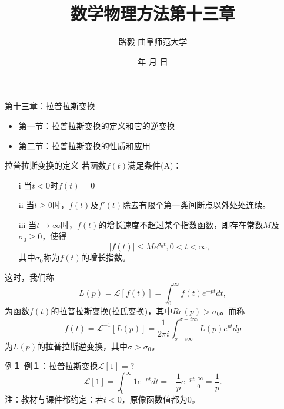 \documentclass[11pt]{beamer}
\begin{document}
	\author{ 路毅 \hspace{0.3cm} 曲阜师范大学 }
	\date{\number\year 年 \number\month 月 \number\day 日}
	\title{数学物理方法第十三章}

\begin{frame}
	\maketitle
\end{frame}

\kaishu

\begin{frame}{第十三章：拉普拉斯变换}
\begin{itemize}
	\item 第一节：拉普拉斯变换的定义和它的逆变换
	\vspace{1cm}
	\item 第二节：拉普拉斯变换的性质和应用
\end{itemize}
\end{frame}

\begin{frame}{拉普拉斯变换的定义}
若函数$f(t)$满足条件(A)：
\begin{itemize}
\item [i] 当$t<0$时$f(t)=0$
\item [ii] 当$t\geq 0$时，$f(t)$及$f'(t)$除去有限个第一类间断点以外处处连续。
\item [iii] 当$t \rightarrow \infty$时，$f(t)$的增长速度不超过某个指数函数，即存在常数$M$及$\sigma_0 \geq 0$，使得
\begin{equation}
|f(t)| \leq M e^{\sigma_0 t}, 0<t<\infty,
\end{equation}
其中$\sigma_0$称为$f(t)$的增长指数。
\end{itemize}
这时，我们称
\begin{equation}
L(p) = \mathscr{L}[f(t)] = \int^\infty_0 f(t) e^{-pt} dt,
\end{equation}
为函数$f(t)$的拉普拉斯变换(拉氏变换)，其中$Re(p) > \sigma_0$。而称
\begin{equation}
f(t) = \mathscr{L}^{-1} [ L(p) ] = \frac{1}{2\pi i} \int^{\sigma + i \infty}_{\sigma - i \infty} L(p) e^{pt} dp
\end{equation}
为$L(p)$的拉普拉斯逆变换，其中$\sigma > \sigma_0$。
\end{frame}

\begin{frame}{例１}
例１：拉普拉斯变换$\mathscr{L}[ 1 ] = ?$
\begin{equation}
\mathscr{L}[1] = \int^\infty_0 1 e^{-pt} dt = - \frac{1}{p} e^{-pt} |^\infty_0 = \frac{1}{p}.
\end{equation}
注：教材与课件都约定：若$t <0$，原像函数值都为0。
\end{frame}
\end{document}
